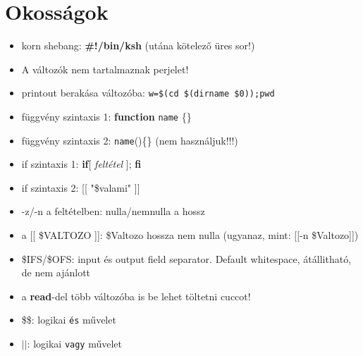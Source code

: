 \documentclass{article}
\begin{document}
\section{Okosságok}
\begin{itemize}
	\item korn shebang: \textbf{\#!/bin/ksh} (utána kötelező üres sor!)
	\item A változók nem tartalmaznak perjelet!
	\item printout berakása változóba: \texttt{w=\$(cd \$(dirname \$0));pwd}
	\item függvény szintaxis 1: \textbf{function} \texttt{name} \{\}
	\item függvény szintaxis 2: \texttt{name}()\{\} (nem használjuk!!!)
	\item if szintaxis 1: \textbf{if}[ \textit{feltétel} ]; \textbf{fi}
	\item if szintaxis 2: [[ "\$valami" ]]
	\item -z/-n a feltételben: nulla/nemnulla a hossz
	\item a [[ \$VALTOZO ]]: \$Valtozo hossza nem nulla (ugyanaz, mint: [[-n \$Valtozo]])
	\item \$IFS/\$OFS: input és output field separator. Default whitespace, átállitható, de nem ajánlott
	\item a \textbf{read}-del több változóba is be lehet töltetni cuccot!
	\item \$\$: logikai \texttt{és} művelet
	\item $||$: logikai \texttt{vagy} művelet
	
\end{itemize}
\end{document}
